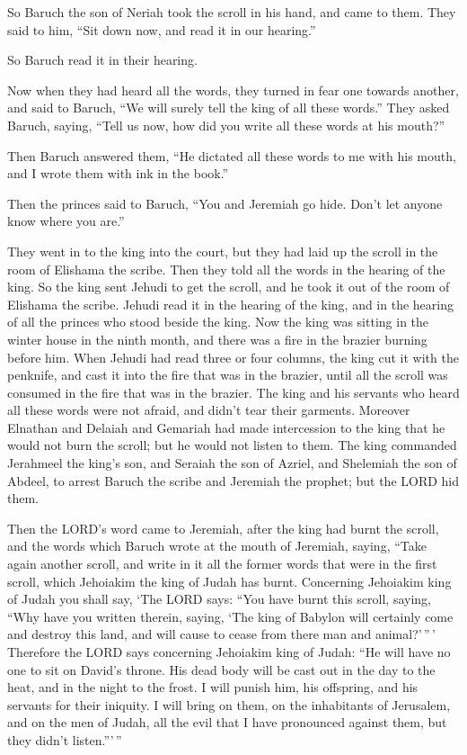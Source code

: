 So Baruch the son of Neriah took the scroll in his hand, and came to
them.  They said to him, ``Sit down now, and read it in
our hearing.''

So Baruch read it in their hearing.

 Now when they had heard all the words, they turned in
fear one towards another, and said to Baruch, ``We will surely tell the
king of all these words.''  They asked Baruch, saying,
``Tell us now, how did you write all these words at his mouth?''

 Then Baruch answered them, ``He dictated all these words
to me with his mouth, and I wrote them with ink in the book.''

 Then the princes said to Baruch, ``You and Jeremiah go
hide. Don't let anyone know where you are.''

 They went in to the king into the court, but they had
laid up the scroll in the room of Elishama the scribe. Then they told
all the words in the hearing of the king.  So the king
sent Jehudi to get the scroll, and he took it out of the room of
Elishama the scribe. Jehudi read it in the hearing of the king, and in
the hearing of all the princes who stood beside the king.
 Now the king was sitting in the winter house in the
ninth month, and there was a fire in the brazier burning before him.
 When Jehudi had read three or four columns, the king cut
it with the penknife, and cast it into the fire that was in the brazier,
until all the scroll was consumed in the fire that was in the brazier.
 The king and his servants who heard all these words were
not afraid, and didn't tear their garments.  Moreover
Elnathan and Delaiah and Gemariah had made intercession to the king that
he would not burn the scroll; but he would not listen to them.
 The king commanded Jerahmeel the king's son, and Seraiah
the son of Azriel, and Shelemiah the son of Abdeel, to arrest Baruch the
scribe and Jeremiah the prophet; but the LORD hid them.

 Then the LORD's word came to Jeremiah, after the king
had burnt the scroll, and the words which Baruch wrote at the mouth of
Jeremiah, saying,  ``Take again another scroll, and write
in it all the former words that were in the first scroll, which
Jehoiakim the king of Judah has burnt.  Concerning
Jehoiakim king of Judah you shall say, `The LORD says: ``You have burnt
this scroll, saying, ``Why have you written therein, saying, `The king
of Babylon will certainly come and destroy this land, and will cause to
cease from there man and animal?'\,''\,'  Therefore the
LORD says concerning Jehoiakim king of Judah: ``He will have no one to
sit on David's throne. His dead body will be cast out in the day to the
heat, and in the night to the frost.  I will punish him,
his offspring, and his servants for their iniquity. I will bring on
them, on the inhabitants of Jerusalem, and on the men of Judah, all the
evil that I have pronounced against them, but they didn't listen.'''\,''

